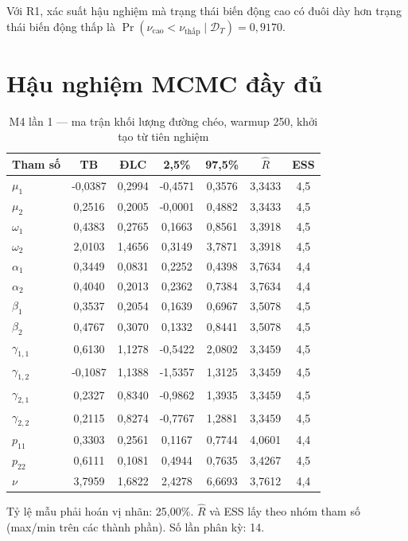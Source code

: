 \documentclass[11pt,a4paper]{article}
\begin{document}
Với R1, xác suất hậu nghiệm mà trạng thái biến động cao có đuôi dày hơn trạng thái
biến động thấp là $\Pr(\nu_{\text{cao}}<\nu_{\text{thấp}}\mid \mathcal{D}_T) = 0{,}9170$.

\section{Hậu nghiệm MCMC đầy đủ}
\begin{table}[H]\centering\footnotesize
\caption{M4 lần 1 --- ma trận khối lượng đường chéo, warmup 250, khởi tạo từ tiên nghiệm}
\begin{tabularx}{\textwidth}{l C C C C C C}
\toprule
\textbf{Tham số} & \textbf{TB} & \textbf{ĐLC} & \textbf{2,5\%} & \textbf{97,5\%} & $\widehat{R}$ & \textbf{ESS} \\
\midrule
$\mu_1$ & -0{,}0387 & 0{,}2994 & -0{,}4571 & 0{,}3576 & 3{,}3433 & 4{,}5 \\
$\mu_2$ & 0{,}2516 & 0{,}2005 & -0{,}0001 & 0{,}4882 & 3{,}3433 & 4{,}5 \\
$\omega_1$ & 0{,}4383 & 0{,}2765 & 0{,}1663 & 0{,}8561 & 3{,}3918 & 4{,}5 \\
$\omega_2$ & 2{,}0103 & 1{,}4656 & 0{,}3149 & 3{,}7871 & 3{,}3918 & 4{,}5 \\
$\alpha_1$ & 0{,}3449 & 0{,}0831 & 0{,}2252 & 0{,}4398 & 3{,}7634 & 4{,}4 \\
$\alpha_2$ & 0{,}4040 & 0{,}2013 & 0{,}2362 & 0{,}7384 & 3{,}7634 & 4{,}4 \\
$\beta_1$ & 0{,}3537 & 0{,}2054 & 0{,}1639 & 0{,}6967 & 3{,}5078 & 4{,}5 \\
$\beta_2$ & 0{,}4767 & 0{,}3070 & 0{,}1332 & 0{,}8441 & 3{,}5078 & 4{,}5 \\
$\gamma_{1,1}$ & 0{,}6130 & 1{,}1278 & -0{,}5422 & 2{,}0802 & 3{,}3459 & 4{,}5 \\
$\gamma_{1,2}$ & -0{,}1087 & 1{,}1388 & -1{,}5357 & 1{,}3125 & 3{,}3459 & 4{,}5 \\
$\gamma_{2,1}$ & 0{,}2327 & 0{,}8340 & -0{,}9862 & 1{,}3935 & 3{,}3459 & 4{,}5 \\
$\gamma_{2,2}$ & 0{,}2115 & 0{,}8274 & -0{,}7767 & 1{,}2881 & 3{,}3459 & 4{,}5 \\
$p_{11}$ & 0{,}3303 & 0{,}2561 & 0{,}1167 & 0{,}7744 & 4{,}0601 & 4{,}4 \\
$p_{22}$ & 0{,}6111 & 0{,}1081 & 0{,}4944 & 0{,}7635 & 3{,}4267 & 4{,}5 \\
$\nu$ & 3{,}7959 & 1{,}6822 & 2{,}4278 & 6{,}6693 & 3{,}7612 & 4{,}4 \\
\bottomrule
\end{tabularx}
\begin{tablenotes}\footnotesize\item Tỷ lệ mẫu phải hoán vị nhãn: 25{,}00\%. $\widehat{R}$ và ESS lấy theo nhóm tham số (max/min trên các thành phần). Số lần phân kỳ: 14.\end{tablenotes}
\end{table}
\end{document}
